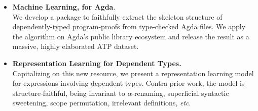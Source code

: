 \documentclass{article}
\begin{document}
\begin{minipage}[t]{0.29\textwidth}
	\begin{itemize}[topsep=-0.25\baselineskip]
		\item \textbf{Machine Learning, for Agda}.\\
		We develop a package to faithfully extract the skeleton structure of dependently-typed program-proofs from type-checked Agda files. We apply the algorithm on Agda's public library ecosystem and release the result as a massive, highly elaborated ATP dataset.
		\item \textbf{Representation Learning for Dependent Types.}\\
		Capitalizing on this new resource, we present a representation learning model for expressions involving dependent types. Contra prior work, the model is structure-faithful, being invariant to $\alpha$-renaming, superficial syntactic sweetening, scope permutation, irrelevant definitions, \textit{etc}. 
	\end{itemize}
	
	\end{minipage}\hfill
\end{document}
